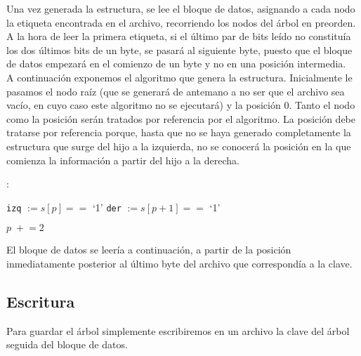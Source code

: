 \documentclass{article}
\newenvironment{algo}{
\vspace*{0.5cm}
\begin{algorithm}[H]}{
\end{algorithm}
\vspace*{0.5cm}
}
\begin{document}
Una vez generada la estructura, se lee el bloque de datos, asignando a cada nodo la
etiqueta encontrada en el archivo, recorriendo los nodos del árbol en preorden. A
la hora de leer la primera etiqueta, si el último par de bits leído no constituía
los dos últimos bits de un byte, se pasará al siguiente byte, puesto que el bloque
de datos empezará en el comienzo de un byte y no en una posición intermedia. \\

A continuación exponemos el algoritmo que genera la estructura. Inicialmente le
pasamos el nodo raíz (que se generará de antemano a no ser que el archivo sea
vacío, en cuyo caso este algoritmo no se ejecutará) y la posición 0. Tanto el nodo
como la posición serán tratados por referencia por el algoritmo. La posición debe
tratarse por referencia porque, hasta que no se haya generado completamente la
estructura que surge del hijo a la izquierda, no se conocerá la posición en la que
comienza la información a partir del hijo a la derecha.

\begin{algo}
: \\

\BlankLine

\texttt{izq} $ := s[p] == $ `1'\;
\texttt{der} $ := s[p+1] == $ `1'\;
\BlankLine


\BlankLine

$p \;+\!\!= 2$\;

\BlankLine


\end{algo}

El bloque de datos se leería a continuación, a partir de la posición inmediatamente
posterior al último byte del archivo que correspondía a la clave.

\subsection{Escritura}

Para guardar el árbol simplemente escribiremos en un archivo la clave del árbol
seguida del bloque de datos. \\
\end{document}
